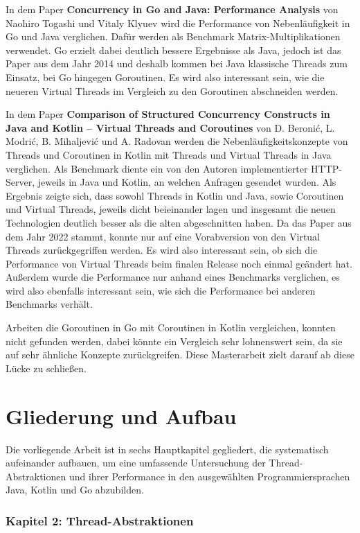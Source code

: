 \documentclass[fontsize=12pt,paper=a4,twoside=semi,parskip=half-,headsepline,headinclude]{scrreprt}
\begin{document}
In dem Paper \textbf{Concurrency in Go and Java: Performance Analysis} \cite{Togashi2014} von Naohiro Togashi und Vitaly Klyuev wird die Performance von Nebenläufigkeit in Go und Java verglichen. Dafür werden als Benchmark Matrix-Multiplikationen verwendet. Go erzielt dabei deutlich bessere Ergebnisse als Java, jedoch ist das Paper aus dem Jahr 2014 und deshalb kommen bei Java klassische Threads zum Einsatz, bei Go hingegen Goroutinen. Es wird also interessant sein, wie die neueren Virtual Threads im Vergleich zu den Goroutinen abschneiden werden.

In dem Paper \textbf{Comparison of Structured Concurrency Constructs in Java and Kotlin – Virtual Threads and Coroutines} \cite{Modric2022} von D. Beronić, L. Modrić, B. Mihaljević und A. Radovan werden die Nebenläufigkeitskonzepte von Threads und Coroutinen in Kotlin mit Threads und Virtual Threads in Java verglichen. Als Benchmark diente ein von den Autoren implementierter HTTP-Server, jeweils in Java und Kotlin, an welchen Anfragen gesendet wurden. Als Ergebnis zeigte sich, dass sowohl Threads in Kotlin und Java, sowie Coroutinen und Virtual Threads, jeweils dicht beieinander lagen und insgesamt die neuen Technologien deutlich besser als die alten abgeschnitten haben. Da das Paper aus dem Jahr 2022 stammt, konnte nur auf eine Vorabversion von den Virtual Threads zurückgegriffen werden. Es wird also interessant sein, ob sich die Performance von Virtual Threads beim finalen Release noch einmal geändert hat. Außerdem wurde die Performance nur anhand eines Benchmarks verglichen, es wird also ebenfalls interessant sein, wie sich die Performance bei anderen Benchmarks verhält.

Arbeiten die Goroutinen in Go mit Coroutinen in Kotlin vergleichen, konnten nicht gefunden werden, dabei könnte ein Vergleich sehr lohnenswert sein, da sie auf sehr ähnliche Konzepte zurückgreifen. Diese Masterarbeit zielt darauf ab diese Lücke zu schließen.

\section{Gliederung und Aufbau}

Die vorliegende Arbeit ist in sechs Hauptkapitel gegliedert, die systematisch aufeinander aufbauen, um eine umfassende Untersuchung der Thread-Abstraktionen und ihrer Performance in den ausgewählten Programmiersprachen Java, Kotlin und Go abzubilden.

\subsubsection{Kapitel 2: Thread-Abstraktionen}
\end{document}
